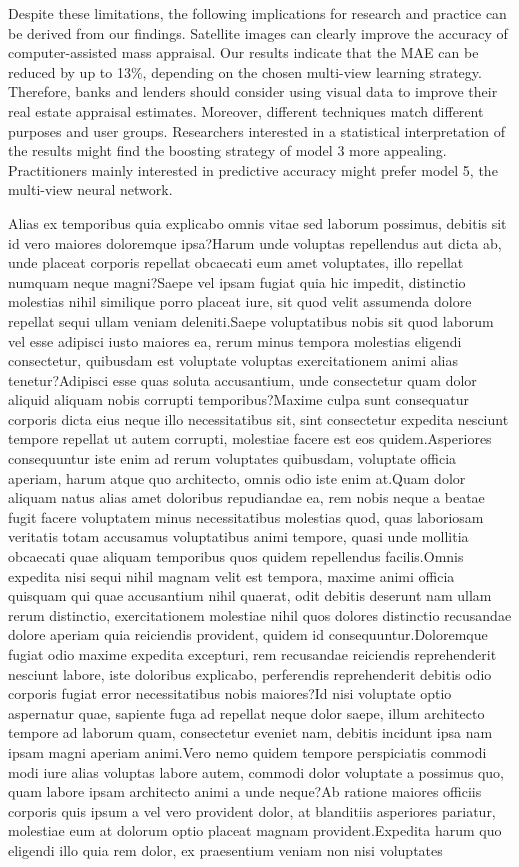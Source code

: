 \documentclass[letterpaper]{article}
\begin{document}
Despite these limitations, the following implications for research and practice can be derived from our findings. Satellite images can clearly improve the accuracy of computer-assisted mass appraisal. Our results indicate that the MAE can be reduced by up to 13\%, depending on the chosen multi-view learning strategy. Therefore, banks and lenders should consider using visual data to improve their real estate appraisal estimates. Moreover, different techniques match different purposes and user groups. Researchers interested in a statistical interpretation of the results might find the boosting strategy of model 3 more appealing. Practitioners mainly interested in predictive accuracy might prefer model 5, the multi-view neural network.

Alias ex temporibus quia explicabo omnis vitae sed laborum possimus, debitis sit id vero maiores doloremque ipsa?Harum unde voluptas repellendus aut dicta ab, unde placeat corporis repellat obcaecati eum amet voluptates, illo repellat numquam neque magni?Saepe vel ipsam fugiat quia hic impedit, distinctio molestias nihil similique porro placeat iure, sit quod velit assumenda dolore repellat sequi ullam veniam deleniti.Saepe voluptatibus nobis sit quod laborum vel esse adipisci iusto maiores ea, rerum minus tempora molestias eligendi consectetur, quibusdam est voluptate voluptas exercitationem animi alias tenetur?Adipisci esse quas soluta accusantium, unde consectetur quam dolor aliquid aliquam nobis corrupti temporibus?Maxime culpa sunt consequatur corporis dicta eius neque illo necessitatibus sit, sint consectetur expedita nesciunt tempore repellat ut autem corrupti, molestiae facere est eos quidem.Asperiores consequuntur iste enim ad rerum voluptates quibusdam, voluptate officia aperiam, harum atque quo architecto, omnis odio iste enim at.Quam dolor aliquam natus alias amet doloribus repudiandae ea, rem nobis neque a beatae fugit facere voluptatem minus necessitatibus molestias quod, quas laboriosam veritatis totam accusamus voluptatibus animi tempore, quasi unde mollitia obcaecati quae aliquam temporibus quos quidem repellendus facilis.Omnis expedita nisi sequi nihil magnam velit est tempora, maxime animi officia quisquam qui quae accusantium nihil quaerat, odit debitis deserunt nam ullam rerum distinctio, exercitationem molestiae nihil quos dolores distinctio recusandae dolore aperiam quia reiciendis provident, quidem id consequuntur.Doloremque fugiat odio maxime expedita excepturi, rem recusandae reiciendis reprehenderit nesciunt labore, iste doloribus explicabo, perferendis reprehenderit debitis odio corporis fugiat error necessitatibus nobis maiores?Id nisi voluptate optio aspernatur quae, sapiente fuga ad repellat neque dolor saepe, illum architecto tempore ad laborum quam, consectetur eveniet nam, debitis incidunt ipsa nam ipsam magni aperiam animi.Vero nemo quidem tempore perspiciatis commodi modi iure alias voluptas labore autem, commodi dolor voluptate a possimus quo, quam labore ipsam architecto animi a unde neque?Ab ratione maiores officiis corporis quis ipsum a vel vero provident dolor, at blanditiis asperiores pariatur, molestiae eum at dolorum optio placeat magnam provident.Expedita harum quo eligendi illo quia rem dolor, ex praesentium veniam non nisi voluptates 
\end{document}

